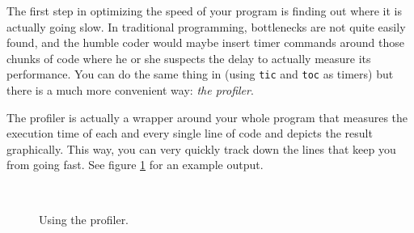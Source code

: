 The first step in optimizing the speed of your program is finding out where it is actually going slow. In traditional programming, bottlenecks are not quite easily found, and the humble coder would maybe insert timer commands around those chunks of code where he or she suspects the delay to actually measure its performance. You can do the same thing in \matlab{} (using \lstinline!tic! and \lstinline!toc! as timers) but there is a much more convenient way: \emph{the profiler}.

The profiler is actually a wrapper around your whole program that measures the execution time of each and every single line of code and depicts the result graphically. This way, you can very quickly track down the lines that keep you from going fast. See figure \ref{figure:profiler} for an example output.

\begin{figure}
\centering
{}\\
\caption{Using the profiler.}
\label{figure:profiler}
\end{figure}


